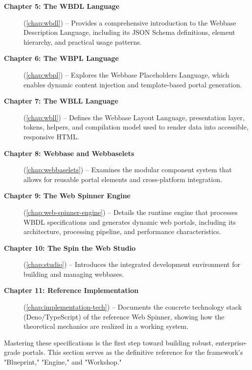 \begin{description}
\item[\textbf{Chapter 5: The WBDL Language}] (\cref{chap:wbdl}) -- Provides a comprehensive introduction to the Webbase Description Language, including its JSON Schema definitions, element hierarchy, and practical usage patterns.

\item[\textbf{Chapter 6: The WBPL Language}] (\cref{chap:wbpl}) -- Explores the Webbase Placeholders Language, which enables dynamic content injection and template-based portal generation.

\item[\textbf{Chapter 7: The WBLL Language}] (\cref{chap:wbll}) -- Defines the Webbase Layout Language, presentation layer, tokens, helpers, and compilation model used to render data into accessible, responsive HTML.

\item[\textbf{Chapter 8: Webbase and Webbaselets}] (\cref{chap:webbaselets}) -- Examines the modular component system that allows for reusable portal elements and cross-platform integration.

\item[\textbf{Chapter 9: The Web Spinner Engine}] (\cref{chap:web-spinner-engine}) -- Details the runtime engine that processes WBDL specifications and generates dynamic web portals, including its architecture, processing pipeline, and performance characteristics.

\item[\textbf{Chapter 10: The Spin the Web Studio}] (\cref{chap:studio}) -- Introduces the integrated development environment for building and managing webbases.

\item[\textbf{Chapter 11: Reference Implementation}] (\cref{chap:implementation-tech}) -- Documents the concrete technology stack (Deno/TypeScript) of the reference Web Spinner, showing how the theoretical mechanics are realized in a working system.
\end{description}

Mastering these specifications is the first step toward building robust, enterprise-grade portals. This section serves as the definitive reference for the framework's "Blueprint," "Engine," and "Workshop."
